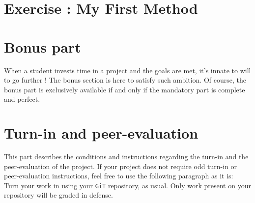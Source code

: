 \documentclass{42-en}
\begin{document}

\chapter{Exercise \exercicenumber: My First Method}

\exnumber{\exercicenumber}

\makeheaderfiles

\chapter{Bonus part}

    When a student invests time in a project and the goals are met,
    it's innate to will to go further ! The bonus section is here to satisfy
    such ambition. Of course, the bonus part is exclusively available
    if and only if the mandatory part is complete and perfect.



\chapter{Turn-in and peer-evaluation}

    This part describes the conditions and instructions regarding the turn-in and
    the peer-evaluation of the project. If your project does not
    require odd turn-in or peer-evaluation instructions, feel free to
    use the following paragraph as it is:\\

    Turn your work in using your \texttt{GiT} repository, as
    usual. Only work present on your repository will be graded in defense.



\end{document}
